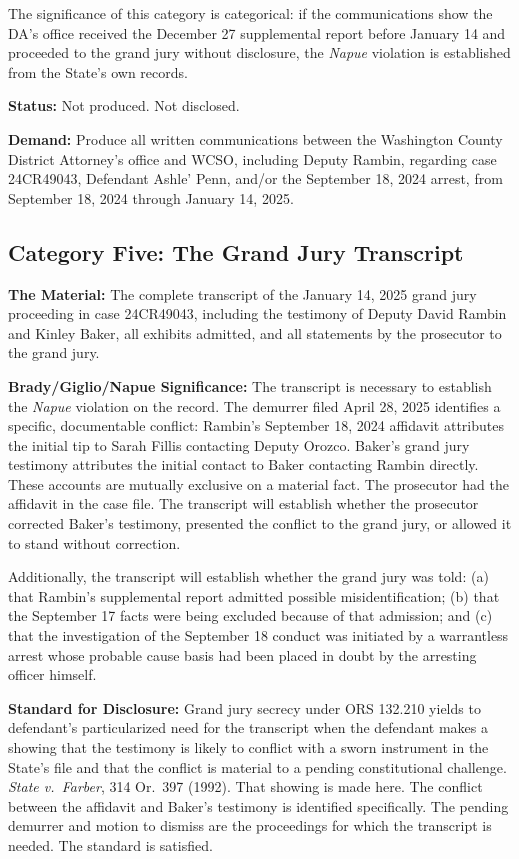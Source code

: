 \documentclass[12pt,letterpaper]{extarticle}
\begin{document}
	The significance of this category is categorical: if the communications show the
	DA's office received the December 27 supplemental report before January 14 and
	proceeded to the grand jury without disclosure, the \textit{Napue} violation is
	established from the State's own records.
	
	\textbf{Status:} Not produced. Not disclosed.
	
	\textbf{Demand:} Produce all written communications between the Washington County
	District Attorney's office and WCSO, including Deputy Rambin, regarding case
	24CR49043, Defendant Ashle' Penn, and/or the September 18, 2024 arrest, from
	September 18, 2024 through January 14, 2025.
	
	\subsection{Category Five: The Grand Jury Transcript}
	
	\textbf{The Material:} The complete transcript of the January 14, 2025 grand jury
	proceeding in case 24CR49043, including the testimony of Deputy David Rambin and
	Kinley Baker, all exhibits admitted, and all statements by the prosecutor to the
	grand jury.
	
	\textbf{Brady/Giglio/Napue Significance:} The transcript is necessary to establish
	the \textit{Napue} violation on the record. The demurrer filed April 28, 2025
	identifies a specific, documentable conflict: Rambin's September 18, 2024
	affidavit attributes the initial tip to Sarah Fillis contacting Deputy Orozco.
	Baker's grand jury testimony attributes the initial contact to Baker contacting
	Rambin directly. These accounts are mutually exclusive on a material fact. The
	prosecutor had the affidavit in the case file. The transcript will establish
	whether the prosecutor corrected Baker's testimony, presented the conflict to the
	grand jury, or allowed it to stand without correction.
	
	Additionally, the transcript will establish whether the grand jury was told: (a)
	that Rambin's supplemental report admitted possible misidentification; (b) that the
	September 17 facts were being excluded because of that admission; and (c) that the
	investigation of the September 18 conduct was initiated by a warrantless arrest
	whose probable cause basis had been placed in doubt by the arresting officer
	himself.
	
	\textbf{Standard for Disclosure:} Grand jury secrecy under ORS 132.210 yields to
	defendant's particularized need for the transcript when the defendant makes a
	showing that the testimony is likely to conflict with a sworn instrument in the
	State's file and that the conflict is material to a pending constitutional
	challenge. \textit{State v.\ Farber}, 314 Or.\ 397 (1992). That showing is made
	here. The conflict between the affidavit and Baker's testimony is identified
	specifically. The pending demurrer and motion to dismiss are the proceedings for
	which the transcript is needed. The standard is satisfied.
	
\end{document}
